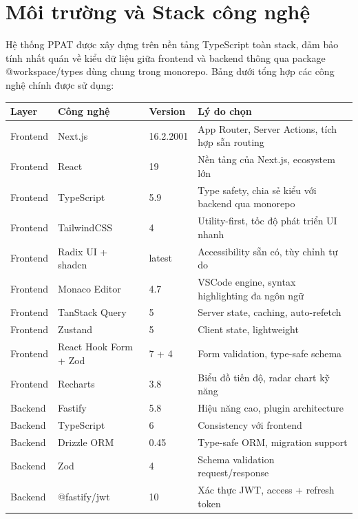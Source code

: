 \documentclass[../main.tex]{subfiles}
\begin{document}
\section{Môi trường và Stack công nghệ}

Hệ thống PPAT được xây dựng trên nền tảng TypeScript toàn stack, đảm bảo tính nhất quán về kiểu dữ liệu giữa frontend và backend thông qua package @workspace/types dùng chung trong monorepo. Bảng dưới tổng hợp các công nghệ chính được sử dụng:


{
\renewcommand{\arraystretch}{1.5}
\begin{tabularx}{\textwidth}{|p{2.0cm}|p{4cm}|p{2.0cm}|X|}
\caption{Bảng tổng hợp công nghệ của thống}
\label{tab:bang-tong-hop-cong-nghe-cua-thong}
\\
\hline
\textbf{Layer} & \textbf{Công nghệ} & \textbf{Version} & \textbf{Lý do chọn} \\
\hline
Frontend & Next.js & 16.2.2001 & App Router, Server Actions, tích hợp sẵn routing \\
\hline
Frontend & React & 19 & Nền tảng của Next.js, ecosystem lớn \\
\hline
Frontend & TypeScript & 5.9 & Type safety, chia sẻ kiểu với backend qua monorepo \\
\hline
Frontend & TailwindCSS & 4 & Utility-first, tốc độ phát triển UI nhanh \\
\hline
Frontend & Radix UI + shadcn & latest & Accessibility sẵn có, tùy chỉnh tự do \\
\hline
Frontend & Monaco Editor & 4.7 & VSCode engine, syntax highlighting đa ngôn ngữ \\
\hline
Frontend & TanStack Query & 5 & Server state, caching, auto-refetch \\
\hline
Frontend & Zustand & 5 & Client state, lightweight \\
\hline
Frontend & React Hook Form + Zod & 7 + 4 & Form validation, type-safe schema \\
\hline
Frontend & Recharts & 3.8 & Biểu đồ tiến độ, radar chart kỹ năng \\
\hline
Backend & Fastify & 5.8 & Hiệu năng cao, plugin architecture \\
\hline
Backend & TypeScript & 6 & Consistency với frontend \\
\hline
Backend & Drizzle ORM & 0.45 & Type-safe ORM, migration support \\
\hline
Backend & Zod & 4 & Schema validation request/response \\
\hline
Backend & @fastify/jwt & 10 & Xác thực JWT, access + refresh token \\

\end{tabularx}}
\end{document}

